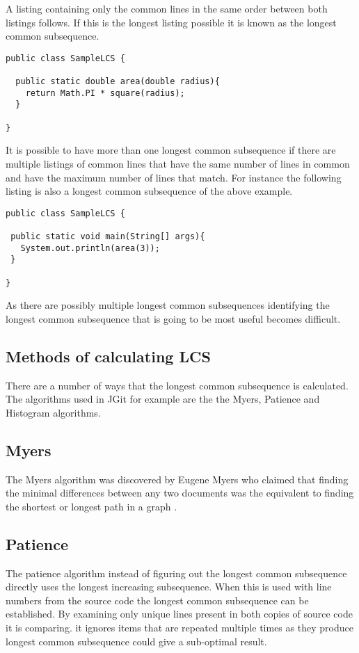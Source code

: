 A listing containing only the common lines in the same order between both listings follows.  If this is the longest listing possible it is known as the longest common subsequence.  

\begin{lstlisting}
public class SampleLCS { 

  public static double area(double radius){
    return Math.PI * square(radius);
  }
  
}

\end{lstlisting}

It is possible to have more than one longest common subsequence if there are multiple listings of common lines that have the same number of lines in common and have the maximum number of lines that match.  For instance the following listing is also a longest common subsequence of the above example.

\begin{lstlisting}
public class SampleLCS {

 public static void main(String[] args){
   System.out.println(area(3));
 }
 
}
\end{lstlisting}

As there are possibly multiple longest common subsequences identifying the longest common subsequence that is going to be most useful becomes difficult.

\subsection{Methods of calculating LCS}
There are a number of ways that the longest common subsequence is calculated. The algorithms used in JGit for example are the the Myers, Patience and Histogram algorithms.

\subsection{Myers}
The Myers algorithm was discovered by Eugene Myers who claimed that finding the minimal differences between any two documents was the equivalent to finding the shortest or longest path in a graph \cite{Myers1986}. 

\subsection{Patience}
The patience algorithm instead of figuring out the longest common subsequence directly uses the longest increasing subsequence.
When this is used with line numbers from the source code the longest common subsequence can be established.
By examining only unique lines present in both copies of source code it is comparing. it ignores items that are repeated multiple times as they produce longest common subsequence could give a sub-optimal result.

